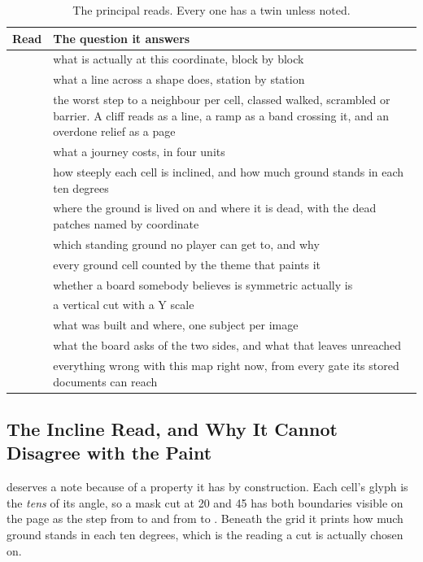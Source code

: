 \begin{table}[htbp]
\caption{The principal reads. Every one has a  twin unless noted.}
\label{tab:reads}
\small
\begin{tabularx}{\textwidth}{L{3.2cm} Y}
\toprule
\textbf{Read} & \textbf{The question it answers} \\
\midrule
{} & what is actually at this coordinate, block by block \\
 & what a line across a shape does, station by station \\
 & the worst step to a neighbour per cell, classed walked,
  scrambled or barrier. A cliff reads as a line, a ramp as a band crossing it, and
  an overdone relief as a page \\
 & what a journey costs, in four units \\
 & how steeply each cell is inclined, and how much ground stands in
  each ten degrees \\
 & where the ground is lived on and where it is dead, with the dead
  patches named by coordinate \\
 & which standing ground no player can get to, and why \\
 & every ground cell counted by the theme that paints it \\
 & whether a board somebody believes is symmetric actually is \\
 & a vertical cut with a Y scale \\
 & what was built and where, one subject per image \\
 & what the board asks of the two sides, and what that leaves
  unreached \\
 & everything wrong with this map right now, from every gate its
  stored documents can reach \\
\bottomrule
\end{tabularx}
\end{table}

\subsection{The Incline Read, and Why It Cannot Disagree with the Paint}

 deserves a note because of a property it has by construction. Each
cell's glyph is the \emph{tens} of its angle, so a mask cut at 20 and 45 has both
boundaries visible on the page as the step from  to  and from  to
. Beneath the grid it prints how much ground stands in each ten degrees,
which is the reading a cut is actually chosen on.

